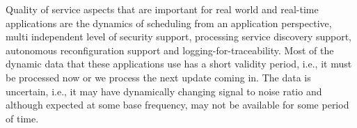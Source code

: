 Quality of service aspects that are important for real world and real-time
applications are the dynamics of scheduling from an application perspective,
multi independent level of security support, processing service discovery support, autonomous reconfiguration support and logging-for-traceability.
Most of the dynamic data that these applications use has a short validity
period, i.e., it must be processed now or we process the next update coming
in. The data is uncertain, i.e., it may have dynamically changing signal to noise ratio
and although expected at some base frequency, may not be available for some
period of time.











